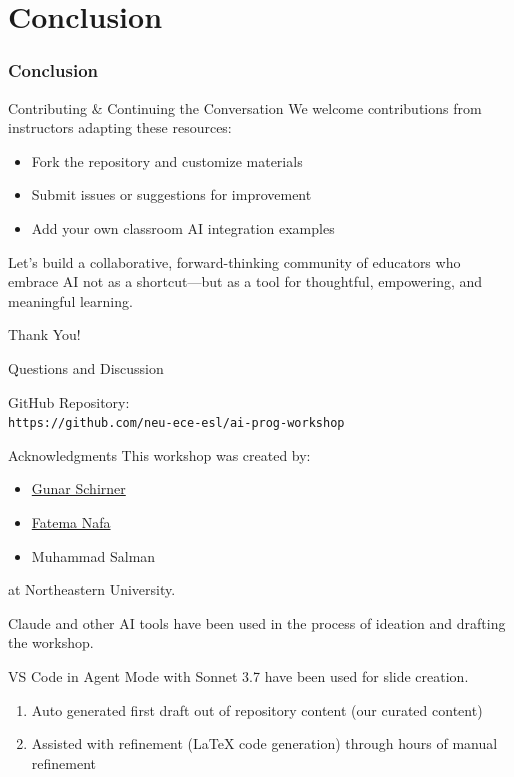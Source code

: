 \documentclass[xcolor=dvipsnames, aspectratio=169]{beamer}
\newcommand{\footername}{AI in Programming Education}
\newcommand{\setfooter}[2]{\renewcommand{\footername}{\href{#2}{#1}}}
\begin{document}
\part[Conclusion]{Conclusion}
\section{Conclusion}
\setfooter{Conclusion}{https://github.com/neu-ece-esl/ai-prog-workshop}

\begin{frame}{Contributing \& Continuing the Conversation}
  We welcome contributions from instructors adapting these resources:
  \begin{itemize}
    \item Fork the repository and customize materials
    \item Submit issues or suggestions for improvement
    \item Add your own classroom AI integration examples
  \end{itemize}
  
  Let's build a collaborative, forward-thinking community of educators who embrace AI not as a shortcut—but as a tool for thoughtful, empowering, and meaningful learning.
\end{frame}


\begin{frame}{Thank You!}
  \begin{center}
    \Large{Questions and Discussion}
    
    \vspace{2em}
    
    GitHub Repository:\\
    \texttt{https://github.com/neu-ece-esl/ai-prog-workshop}
  \end{center}
\end{frame}

\begin{frame}{Acknowledgments}
  This workshop was created by:
  \begin{itemize}
    \item \href{https://coe.northeastern.edu/people/schirner-gunar/}{Gunar Schirner}
    \item \href{https://coe.northeastern.edu/people/nafa-fatema/}{Fatema Nafa}
    \item Muhammad Salman
  \end{itemize}
  
  at Northeastern University.
  
  \vspace{1em}
  
  Claude and other AI tools have been used in the process of ideation and drafting the workshop.

  VS Code in Agent Mode with Sonnet 3.7 have been used for slide creation.
  \begin{enumerate}
    \item Auto generated first draft out of repository content (our curated content)  
    \item Assisted with refinement (LaTeX code generation) through hours of manual refinement
  \end{enumerate}
\end{frame}
\end{document}
